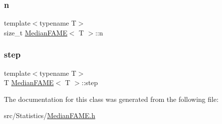 \mbox{\label{class_median_f_a_m_e_a0318b43dd3ae39b735a152c16ae4baec}} 
\subsubsection{\texorpdfstring{n}{n}}
{\footnotesize\ttfamily template$<$typename T$>$ \\
size\+\_\+t \hyperlink{class_median_f_a_m_e}{Median\+F\+A\+ME}$<$ T $>$\+::n}

\mbox{\label{class_median_f_a_m_e_a99c7b975965259ed4079c08836583732}} 
\subsubsection{\texorpdfstring{step}{step}}
{\footnotesize\ttfamily template$<$typename T$>$ \\
T \hyperlink{class_median_f_a_m_e}{Median\+F\+A\+ME}$<$ T $>$\+::step}



The documentation for this class was generated from the following file\+:\begin{DoxyCompactItemize}
\item 
src/\+Statistics/\hyperlink{_median_f_a_m_e_8h}{Median\+F\+A\+M\+E.\+h}\end{DoxyCompactItemize}

